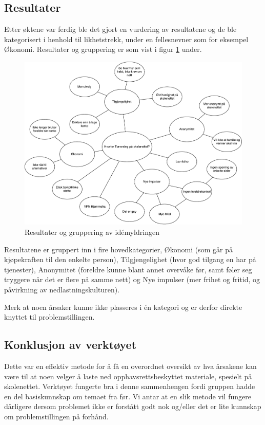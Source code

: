 \subsection{Resultater}
Etter øktene var ferdig ble det gjort en vurdering av resultatene og de ble kategorisert i henhold til likhetstrekk, under en fellesnevner som for eksempel Økonomi. Resultater og gruppering er som vist i figur \ref{fig:idemyldring} under.

\begin{figure}[H]
    \centering    \includegraphics[scale=0.6]{case_1/bilder/idemyldring}
    \caption[Idémyldring]{Resultater og gruppering av idémyldringen}
    \label{fig:idemyldring}
\end{figure}

Resultatene er gruppert inn i fire hovedkategorier, Økonomi (som går på kjøpekraften til den enkelte person), Tilgjengelighet (hvor god tilgang en har på tjenester), Anonymitet (foreldre kunne blant annet overvåke før, samt føler seg tryggere når det er flere på samme nett) og Nye impulser (mer frihet og fritid, og påvirkning av nedlastningskulturen).

Merk at noen årsaker kunne ikke plasseres i én kategori og er derfor direkte knyttet til problemstillingen. 


\subsection{Konklusjon av verktøyet}
Dette var en effektiv metode for å få en overordnet oversikt av hva årsakene kan være til at noen velger å laste ned opphavsrettsbeskyttet materiale, spesielt på skolenettet. Verktøyet fungerte bra i denne sammenhengen fordi gruppen hadde en del basiskunnskap om temaet fra før. Vi antar at en slik metode vil fungere dårligere dersom problemet ikke er forstått godt nok og/eller det er lite kunnskap om problemstillingen på forhånd.